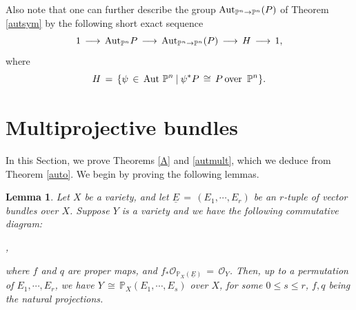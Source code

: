 \documentclass[12pt,reqno]{amsart}
\newtheorem{lemma}{Lemma}[section]
\theoremstyle{definition}
\numberwithin{equation}{section}
\begin{document}
Also note that one can further describe the group $ \textnormal{Aut}_{\mathbb{P}^n\rightarrow \mathbb{P}^n}(P)$ of Theorem \ref{autsym} by the following short exact sequence 
    $$ 1\,\longrightarrow\, \textnormal{Aut}_{\mathbb{P}^n}P \,\longrightarrow\, \textnormal{Aut}_{\mathbb{P}^n\rightarrow \mathbb{P}^n}(P) \,\longrightarrow\, H \,\longrightarrow\, 1,$$ 
    where 
    $$ H\,=\, \{ \psi \,\in\, \textnormal{Aut } \mathbb{P}^n \medspace | \medspace \psi^{\ast}P \,\cong\, P \hspace{2pt} \textnormal{over } \hspace{2pt} \mathbb{P}^n \}.$$
\section{Multiprojective bundles}
In this Section, we prove Theorems \ref{A} and \ref{autmult}, which we deduce from Theorem \ref{auto}. We begin by proving the following lemmas.
\begin{lemma} \label{contr}
Let $X$ be a variety, and let $\underline{E}\,=\,(E_{1},\cdots,E_{r })$ be an $r$-tuple of vector bundles over $X$. Suppose $Y$ is a variety and we have the following commutative diagram: \begin{center}
,
\end{center}
where $f$ and $q$ are proper maps, and $f_{\ast}\mathcal{O}_{{\mathbb{P}}_{X}(\underline{E})} \,=\, \mathcal{O}_{Y}$. Then, up to a permutation of $E_{1},\cdots,E_{r}$, we have  $Y \,\cong\, \mathbb{P}_{X}(E_{1},\cdots, E_{s})$ over $X$, for some $0\leq s\leq r$, $f,q$ being the natural projections.
\end{lemma}
\end{document}
